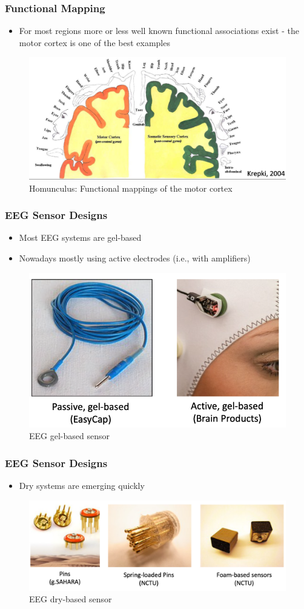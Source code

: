 \documentclass{beamer}
\begin{document}
\begin{frame}
\frametitle{Functional Mapping}
\begin{itemize}
	\item For most regions more or less well known functional associations exist - the motor cortex is one of the best examples
\end{itemize}
	\begin{figure}
		\includegraphics[width=0.7\linewidth]{image/motor}
		\caption{Homunculus: Functional mappings of the motor cortex}
	\end{figure}
\end{frame}

\begin{frame}
\frametitle{EEG Sensor Designs}
\begin{itemize}
	\item Most EEG systems are gel-based
	\item Nowadays mostly using active electrodes (i.e., with amplifiers)
\end{itemize}
\begin{figure}
	\includegraphics[width=0.7\linewidth]{image/sensor}
	\caption{EEG gel-based sensor}
\end{figure}
\end{frame}

\begin{frame}
\frametitle{EEG Sensor Designs}
\begin{itemize}
	\item Dry systems are emerging quickly
\end{itemize}
\begin{figure}
	\includegraphics[width=0.7\linewidth]{image/sensor2}
	\caption{EEG dry-based sensor}
\end{figure}
\end{frame}
\end{document}
